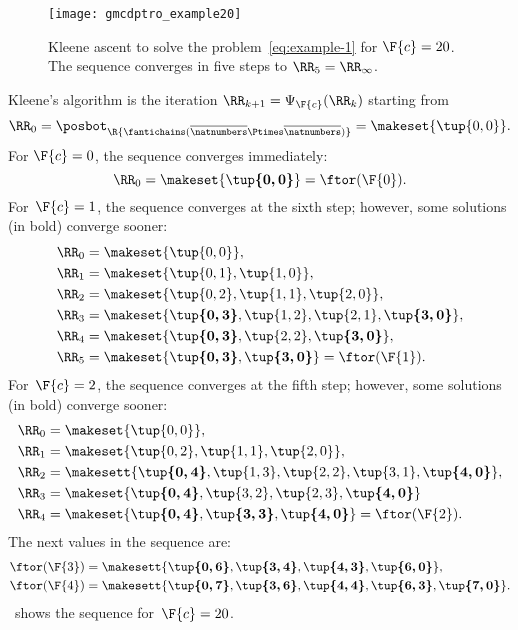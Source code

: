 \begin{figure}
    \centering
    \texttt{[image: gmcdptro\_example20]}
    \caption{
        Kleene ascent to solve the problem~\cref{eq:example-1} for $\F{c}=20$.
        The sequence converges in five steps to $\RR_{5}=\RR_{\infty}$.
    }
    \label{fig:example24}
\end{figure}
%
Kleene's algorithm is the iteration $\RR_{k+1}=\Psi_{\F{c}}(\RR_{k})$ starting from
\begin{equation}
    \RR_{0}
    =
    \posbot_{\R{\fantichains(\overline{\natnumbers}\Ptimes\overline{\natnumbers})}}
    =\makeset{\tup{0,0} }.
\end{equation}
%
For $\F{c}=0$, the sequence converges immediately:
%
\begin{equation}
    \RR_{0}=\makeset{\boldsymbol{\tup{0,0}}}=\ftor(\F{0}).
\end{equation}
%
For~$\F{c}=1$, the sequence converges at the sixth step; however, some solutions (in bold) converge sooner:
%
\begin{align}
    \RR_{0} & =\makeset{\tup{0,0} }, \\
    \RR_{1} & =\makeset{\tup{0,1}, \tup{1,0}}, \\
    \RR_{2} & =\makeset{\tup{0,2}, \tup{1,1}, \tup{2,0}}, \\
    \RR_{3} & =\makeset{\boldsymbol{\tup{0,3}}, \tup{1,2}, \tup{2,1}, \boldsymbol{\tup{3,0}}}, \\
    \RR_{4} & =\makeset{\boldsymbol{\tup{0,3}}, \tup{2,2}, \boldsymbol{\tup{3,0}}}, \\
    \RR_{5} & =\makeset{\boldsymbol{\tup{0,3}},\boldsymbol{\tup{3,0}}}=\ftor(\F{1}).
\end{align}
%
For~$\F{c}=2$, the sequence converges at the fifth step; however, some solutions (in bold) converge sooner:
%
\begin{align}
    \RR_{0} & =\makeset{\tup{0,0} }, \\
    \RR_{1} & =\makeset{\tup{0,2}, \tup{1,1}, \tup{2,0} }, \\
    \RR_{2} & =\makesett{ \boldsymbol{\tup{0,4} }, \tup{1,3}, \tup{2,2}, \tup{3,1}, \boldsymbol{\tup{4,0} }}, \\
    \RR_{3} & =\makeset{\boldsymbol{\tup{0,4} }, \tup{3,2}, \tup{2,3}, \boldsymbol{\tup{4,0} }} \\
    \RR_{4} & =\makeset{\boldsymbol{\tup{0,4} },\boldsymbol{\tup{3,3}},\boldsymbol{\tup{4,0} }}=\ftor(\F{2}).
\end{align}
%
The next values in the sequence are:
%
\begin{align}
    \ftor(\F{3}) & =\makesett{ \boldsymbol{\tup{0,6} },\boldsymbol{\tup{3,4}}, \boldsymbol{\tup{4,3} },\boldsymbol{\tup{6,0} }}, \\
    \ftor(\F{4}) & =\makesett{ \boldsymbol{\tup{0,7} },\boldsymbol{\tup{3,6}}, \boldsymbol{\tup{4,4} },\boldsymbol{\tup{6,3} },\boldsymbol{\tup{7,0} }} .
\end{align}
%
~shows the sequence for~$\F{c}=20$.

